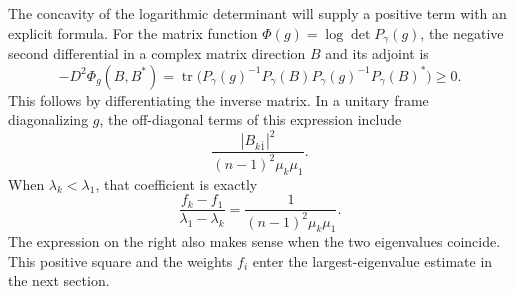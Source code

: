 The concavity of the logarithmic determinant will supply a positive term with an explicit formula. For the matrix function $\Phi(g)=\log\det P_\gamma(g)$, the negative second differential in a complex matrix direction $B$ and its adjoint is
\begin{equation}\label{eq:stw-concavity-square}
 -D^2\Phi_g(B,B^*)
   =\operatorname{tr}\bigl(P_\gamma(g)^{-1}P_\gamma(B)
                   P_\gamma(g)^{-1}P_\gamma(B)^*\bigr)\geq0.
\end{equation}
This follows by differentiating the inverse matrix. In a unitary frame diagonalizing $g$, the off-diagonal terms of this expression include
\[
 \frac{|B_{k\bar1}|^2}{(n-1)^2\mu_k\mu_1}.
\]
When $\lambda_k<\lambda_1$, that coefficient is exactly
\[
 \frac{f_k-f_1}{\lambda_1-\lambda_k}
       =\frac1{(n-1)^2\mu_k\mu_1}.
\]
The expression on the right also makes sense when the two eigenvalues coincide. This positive square and the weights $f_i$ enter the largest-eigenvalue estimate in the next section.
